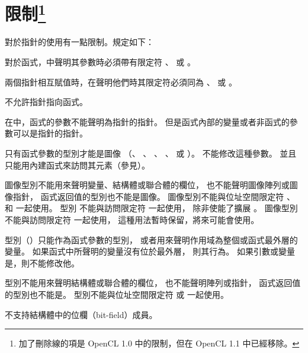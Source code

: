 \section[sec:restrictions]{限制\footnote{
加了刪除線的項是 OpenCL 1.0 中的限制，但在 OpenCL 1.1 中已經移除。}}

\startigBig

\startitem
對於指針的使用有一點限制。規定如下：
\startigBig

\startitem
對於函式，中聲明其參數時必須帶有限定符
 、  或 。
\stopitem

\startitem
兩個指針相互賦值時，在聲明他們時其限定符必須同為
 、  或 。
\stopitem

\startitem
不允許指針指向函式。
\stopitem

\startitem
在中，函式的參數不能聲明為指針的指針。
但是函式內部的變量或者非函式的參數可以是指針的指針。
\stopitem

\stopigBig
\stopitem

\startitem
只有函式參數的型別才能是圖像
（、 、 、
、  或 ）。
不能修改這種參數。
並且只能用內建函式來訪問其元素（參見）。

圖像型別不能用來聲明變量、結構體或聯合體的欄位，
也不能聲明圖像陣列或圖像指針，
函式返回值的型別也不能是圖像。
圖像型別不能與位址空間限定符
 、  和  一起使用。
型別  不能與訪問限定符  一起使用，
除非使能了擴展 。
圖像型別不能與訪問限定符  一起使用，
這種用法暫時保留，將來可能會使用。

型別（）只能作為函式參數的型別，
或者用來聲明作用域為整個或函式最外層的變量。
如果函式中所聲明的變量沒有位於最外層，
則其行為。
如果引數或變量是，則不能修改他。

型別不能用來聲明結構體或聯合體的欄位，
也不能聲明陣列或指針，
函式返回值的型別也不能是。
型別不能與位址空間限定符  或  一起使用。
\stopitem

不支持結構體中的位欄（bit-field）成員。
\stopitem

